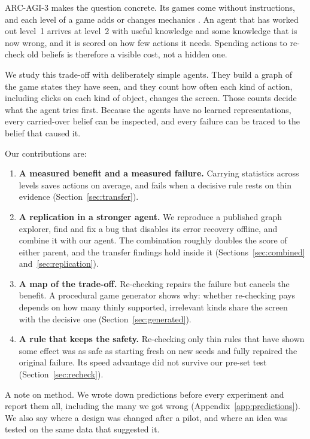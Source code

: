\documentclass[11pt,a4paper]{article}
\begin{document}
ARC-AGI-3 makes the question concrete. Its games come without instructions, and each level of a game adds or changes mechanics \citep{arcprize2026}. An agent that has worked out level~1 arrives at level~2 with useful knowledge and some knowledge that is now wrong, and it is scored on how few actions it needs. Spending actions to re-check old beliefs is therefore a visible cost, not a hidden one.

We study this trade-off with deliberately simple agents. They build a graph of the game states they have seen, and they count how often each kind of action, including clicks on each kind of object, changes the screen. Those counts decide what the agent tries first. Because the agents have no learned representations, every carried-over belief can be inspected, and every failure can be traced to the belief that caused it.

Our contributions are:
\begin{enumerate}
  \item \textbf{A measured benefit and a measured failure.} Carrying statistics across levels saves actions on average, and fails when a decisive rule rests on thin evidence (Section~\ref{sec:transfer}).
  \item \textbf{A replication in a stronger agent.} We reproduce a published graph explorer, find and fix a bug that disables its error recovery offline, and combine it with our agent. The combination roughly doubles the score of either parent, and the transfer findings hold inside it (Sections~\ref{sec:combined} and~\ref{sec:replication}).
  \item \textbf{A map of the trade-off.} Re-checking repairs the failure but cancels the benefit. A procedural game generator shows why: whether re-checking pays depends on how many thinly supported, irrelevant kinds share the screen with the decisive one (Section~\ref{sec:generated}).
  \item \textbf{A rule that keeps the safety.} Re-checking only thin rules that have shown some effect was as safe as starting fresh on new seeds and fully repaired the original failure. Its speed advantage did not survive our pre-set test (Section~\ref{sec:recheck}).
\end{enumerate}

A note on method. We wrote down predictions before every experiment and report them all, including the many we got wrong (Appendix~\ref{app:predictions}). We also say where a design was changed after a pilot, and where an idea was tested on the same data that suggested it.
\end{document}
